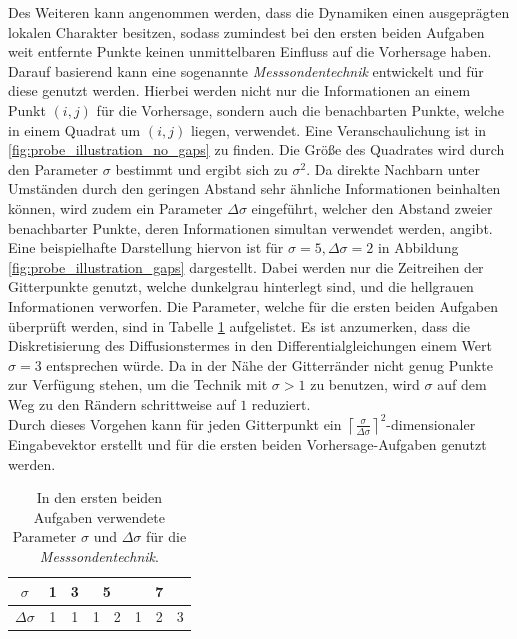 Des Weiteren kann angenommen werden, dass die Dynamiken einen ausgeprägten lokalen Charakter besitzen, sodass zumindest bei den ersten beiden Aufgaben weit entfernte Punkte keinen unmittelbaren Einfluss auf die Vorhersage haben. Darauf basierend kann eine sogenannte \textit{Messsondentechnik} entwickelt und für diese genutzt werden. Hierbei werden nicht nur die Informationen an einem Punkt $(i, j)$ für die Vorhersage, sondern auch die benachbarten Punkte, welche in einem Quadrat um $(i, j)$ liegen, verwendet. Eine Veranschaulichung ist in \ref{fig:probe_illustration_no_gaps} zu finden. Die Größe des Quadrates wird durch den Parameter $\sigma$ bestimmt und ergibt sich zu $\sigma^2$. Da direkte Nachbarn unter Umständen durch den geringen Abstand sehr ähnliche Informationen beinhalten können, wird zudem ein Parameter $\Delta \sigma$ eingeführt, welcher den Abstand zweier benachbarter Punkte, deren Informationen simultan verwendet werden, angibt. Eine beispielhafte Darstellung hiervon ist für $\sigma = 5, \Delta \sigma=2$ in Abbildung \ref{fig:probe_illustration_gaps} dargestellt. Dabei werden nur die Zeitreihen der Gitterpunkte genutzt, welche dunkelgrau hinterlegt sind, und die hellgrauen Informationen verworfen. Die Parameter, welche für die ersten beiden Aufgaben überprüft werden, sind in Tabelle \ref{tab:probe_sigma_values} aufgelistet. Es ist anzumerken, dass die Diskretisierung des Diffusionstermes in den Differentialgleichungen einem Wert $\sigma=3$ entsprechen würde. Da in der Nähe der Gitterränder nicht genug Punkte zur Verfügung stehen, um die Technik mit $\sigma>1$ zu benutzen, wird $\sigma$ auf dem Weg zu den Rändern schrittweise auf $1$ reduziert.\\
Durch dieses Vorgehen kann für jeden Gitterpunkt ein ${\left \lceil{\frac{\sigma}{\Delta \sigma}}\right \rceil}^2$-dimensionaler Eingabevektor erstellt und für die ersten beiden Vorhersage-Aufgaben genutzt werden.\\

\begin{table}[h]
\centering
\begin{tabular}{cc|c|c|c|c|c|c}
\hline
$\sigma$ & 1 & 3 & \multicolumn{2}{c|}{5} & \multicolumn{3}{c}{7} \\
\hline
$\Delta \sigma$ & 1 & 1 & 1 & 2 & 1 & 2 & 3 \\
\hline
\end{tabular} 
\caption{In den ersten beiden Aufgaben verwendete Parameter $\sigma$ und $\Delta \sigma$ für die \textit{Messsondentechnik}.}
\label{tab:probe_sigma_values}
\end{table} 

